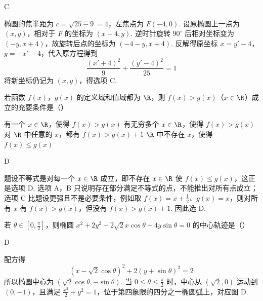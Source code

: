 \documentclass[UTF8,a4paper,oneside,11pt]{ctexbook}
\begin{document}
\begin{answer}
C
\end{answer}

\begin{solution}
椭圆的焦半距为 \(c=\sqrt{25-9}=4\)，左焦点为 \(F(-4,0)\). 设原椭圆上一点为 \((x,y)\)，相对于 \(F\) 的坐标为 \((x+4,y)\). 逆时针旋转 \(90^\circ\) 后相对坐标变为 \((-y,x+4)\)，故旋转后点的坐标为 \((-4-y,x+4)\). 反解得原坐标 \(x=y'-4\)，\(y=-x'-4\)，代入原方程得到
\[
\frac{(x'+4)^2}{9}+\frac{(y'-4)^2}{25}=1
\]
将新坐标仍记为 \((x,y)\)，得选项 C.
\end{solution}

\begin{problem}
若函数 \(f(x)\)，\(g(x)\) 的定义域和值域都为 \(\R\)，则 \(f(x)>g(x)\)（\(x\in\R\)）成立的充要条件是（\quad）

\choices
    {有一个 \(x\in\R\)，使得 \(f(x)>g(x)\)}
    {有无穷多个 \(x\in\R\)，使得 \(f(x)>g(x)\)}
    {对 \(\R\) 中任意的 \(x\)，都有 \(f(x)>g(x)+1\)}
    {\(\R\) 中不存在 \(x\)，使得 \(f(x)\leqslant g(x)\)}
\end{problem}

\begin{answer}
D
\end{answer}

\begin{solution}
题设不等式是对每一个 \(x\in\R\) 成立，即不存在 \(x\in\R\) 使 \(f(x)\leqslant g(x)\)，这正是选项 D. 选项 A，B 只说明存在部分满足不等式的点，不能推出对所有点成立；选项 C 比题设更强且不是必要条件，例如取 \(f(x)=x+\frac{1}{2}\)、\(g(x)=x\)，则对所有 \(x\) 有 \(f(x)>g(x)\)，但没有 \(f(x)>g(x)+1\). 因此选 D.
\end{solution}

\begin{problem}
若 \(\theta\in\left[0,\frac{\pi}{2}\right]\)，则椭圆 \(x^2+2y^2-2\sqrt{2}x\cos\theta+4y\sin\theta=0\) 的中心轨迹是（\quad）

\choices
    {}
    {}
    {}
    {}
\end{problem}

\begin{answer}
D
\end{answer}

\begin{solution}
配方得
\[
\left(x-\sqrt{2}\cos\theta\right)^2+2\left(y+\sin\theta\right)^2=2
\]
所以椭圆中心为 \(\left(\sqrt{2}\cos\theta,-\sin\theta\right)\). 当 \(0\leqslant\theta\leqslant\frac{\pi}{2}\) 时，中心从 \((\sqrt{2},0)\) 运动到 \((0,-1)\)，且满足 \(\frac{x^2}{2}+y^2=1\)，位于第四象限的四分之一椭圆弧上，对应图 D.
\end{solution}
\end{document}
